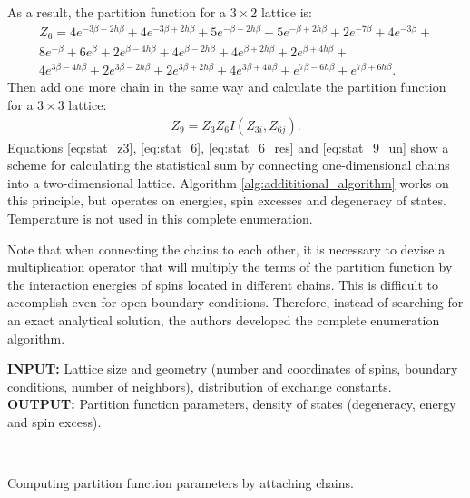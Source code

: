 \documentclass[preprint,12pt]{elsarticle}
\begin{document}
	As a result, the partition function for a $3 \times 2$ lattice is:
	\begin{equation}
		\label{eq:stat_6_res}
		\begin{alignedat}{3}
			Z_6 = 4 e^{ - 3 \beta-2 h\beta} + 4 e^{- 3 \beta+2 h\beta} + 5 e^{- \beta-2 h\beta } + 5 e^{- \beta+2 h\beta } + 2 e^{-7 \beta} + 4 e^{-3 \beta} + \\
			8 e^{-\beta} + 6 e^{\beta} + 2 e^{\beta-4 h\beta } + 4 e^{\beta-2 h\beta } + 4 e^{\beta+2 h\beta } + 2 e^{\beta+4 h\beta } + \\
			4 e^{3 \beta-4 h\beta } + 2 e^{3 \beta-2 h\beta } + 2 e^{3 \beta+2 h\beta } + 4 e^{3 \beta+4 h\beta } + e^{7 \beta-6 h\beta } + e^{7 \beta+6 h\beta }.
		\end{alignedat}
	\end{equation}
Then add one more chain in the same way and calculate the partition function for a $3 \times 3$ lattice:
\begin{equation}
	\label{eq:stat_9_un}
	\begin{alignedat}{2}
		Z_9 =  Z_{3}Z_{6}I(Z_{3i},Z_{6j}).
	\end{alignedat}
\end{equation}
Equations \eqref{eq:stat_z3}, \eqref{eq:stat_6}, \eqref{eq:stat_6_res} and  \eqref{eq:stat_9_un} show a scheme for calculating the statistical sum by connecting one-dimensional chains into a two-dimensional lattice. Algorithm \ref{alg:addititional_algorithm} \cite{trukhin2024glaurung} works on this principle, but operates on energies, spin excesses and degeneracy of states. Temperature is not used in this complete enumeration.
	
	Note that when connecting the chains to each other, it is necessary to devise a multiplication operator that will multiply the terms of the partition function by the interaction energies of spins located in different chains. This is difficult to accomplish even for open boundary conditions. Therefore, instead of searching for an exact analytical solution, the authors developed the complete enumeration algorithm.
	
	
	\begin{algorithm}[H]
		\textbf{INPUT:} Lattice size and geometry (number and coordinates of spins, boundary conditions, number of neighbors), distribution of exchange constants.\\
		\textbf{OUTPUT:} Partition function parameters, density of states (degeneracy, energy and spin excess).
		\begin{algorithmic}
			{
				{
				}
				\ENDFOR \\
			}
			\ENDFOR
		\end{algorithmic}
		\caption{Computing partition function parameters by attaching chains.}
		\label{alg:addititional_algorithm}
	\end{algorithm}
	
\end{document}
